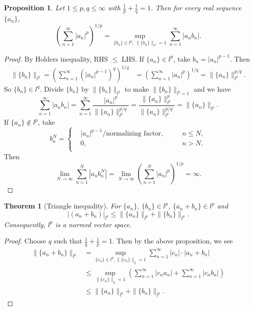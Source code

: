 \documentclass[12pt]{article}
\theoremstyle{plain}
\newtheorem{thm}{Theorem}
\newtheorem*{prop}{Proposition}
\theoremstyle{definition}
\begin{document}
\begin{prop}
    Let $1\leq p, q\leq \infty$ with $\frac{1}{p} + \frac{1}{q} = 1$.
    Then for every real sequence $\{a_n\}$,
    \[\left(\sum_{n=1}^\infty |a_n|^p\right)^{1/p} = \sup_{\{b_n\}\in l^q,\ \|\{b_n\}\|_{l^q} = 1} \sum_{n=1}^\infty
    |a_nb_n|.\]
\end{prop}
\begin{proof}
    By Holders inequality, RHS $\leq$ LHS.
    If $\{a_n\}\in l^p$, take $b_n = |a_n|^{p-1}$.
    Then
    \[\begin{aligned}
            \|\{b_n\}\|_{l^q} = \left(\sum_{n=1}^\infty \left(|a_n|^{p-1}\right)^q\right)^{1/q} &= \left(\sum_{n=1}^\infty
            |a_n|^p\right)^{1/q} = \|\{a_n\}\|_{l^p}^{p/q}.
    \end{aligned}\]
    So $\{b_n\}\in l^q$.
    Divide $\{b_n\}$ by $\|\{b_n\}\|_{l^q}$ to make $\|\{b_n\}\|_{l^q=1}$ and
    we have
    \[
        \sum_{n=1}^\infty |a_nb_n| = \sum_{n=1}^\infty \frac{|a_n|^p}{\|\{a_n\}\|_{l^p}^{p/q}} =
        \frac{\|\{a_n\}\|_{l^p}^p}{\|\{a_n\}\|_{l^p}^{p/q}} = \|\{a_n\}\|_{l^p}.
    \]
    If $\{a_n\}\notin l^p$, take
    \[b_n^N=\left\{
            \begin{aligned}
                &|a_n|^{p-1}/\text{normalizing factor},\quad&& n\leq N,\\
                &0,&&n>N.\\
        \end{aligned}
    \right.\]
    Then
    \[
        \lim_{N\rightarrow\infty}\sum_{n=1}^N |a_nb_n^N| = \lim_{N\rightarrow\infty}\left(\sum_{n=1}^N
        |a_n|^p\right)^{1/p} = \infty.
    \]
\end{proof}

\begin{thm}[Triangle inequality]
    For $\{a_n\},\ \{b_n\}\in l^p$, $\{a_n+b_n\}\in l^p$ and 
    \[
        |(a_n+b_n)|_{l^p} \leq \|\{a_n\}\|_{l^p} + \|\{b_n\}\|_{l^p}.
    \]
    Consequently, $l^p$ is a normed vector space.
\end{thm}
\begin{proof}
    Choose $q$ such that $\frac{1}{q} + \frac{1}{p} = 1$.
    Then by the above proposition, we see
    \[
        \begin{aligned}
            \|\{a_n+b_n\}\|_{l^p} 
            &= \sup_{\{c_n\}\in l^q, \|\{c_n\}\|_q=1} \sum_{n=1}^\infty |c_n|\cdot |a_n+b_n|\\
            &\leq \sup_{\|\{c_n\}\|_q = 1} \left(\sum_{n=1}^\infty |c_n a_n| + \sum_{n=1}^\infty |c_nb_n|\right)\\
            &\leq \|\{a_n\}\|_{l^p} + \|\{b_n\}\|_{l^p}.
        \end{aligned}
    \]
\end{proof}
\end{document}
